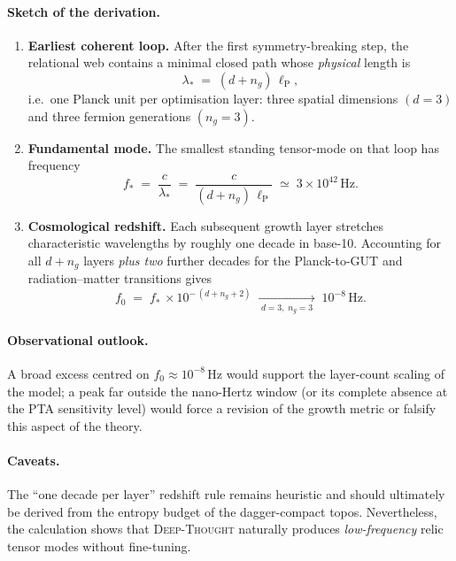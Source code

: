 \documentclass{article}
\begin{document}
\paragraph{Sketch of the derivation.}

\begin{enumerate}
\item\textbf{Earliest coherent loop.}  
  After the first symmetry-breaking step, the relational web contains a
  minimal closed path whose \emph{physical} length is
  \[
     \lambda_{*} \;=\; (d+n_{g})\,\ell_{\mathrm{P}},
  \]
  i.e.\ one Planck unit per optimisation layer:
  three spatial dimensions \((d=3)\) and three fermion generations
  \((n_{g}=3)\).

\item\textbf{Fundamental mode.}  
  The smallest standing tensor-mode on that loop has frequency
  \[
     f_{*}\;=\;\frac{c}{\lambda_{*}}
              \;=\;\frac{c}{(d+n_{g})\,\ell_{\mathrm{P}}}
              \;\simeq\;3\times10^{42}\,\text{Hz}.
  \]

\item\textbf{Cosmological redshift.}  
  Each subsequent growth layer stretches characteristic wavelengths by
  roughly one decade in base-10.  
  Accounting for all \(d+n_{g}\) layers \emph{plus two} further decades
  for the Planck-to-GUT and radiation–matter transitions gives
  \[
     f_{0}
       \;=\;
        f_{*}\,\times 10^{-\,(d+n_{g}+2)}
       \;\xrightarrow[\;d=3,\;n_{g}=3\;]{}\;
        10^{-8}\,\text{Hz}.
  \]
\end{enumerate}

\paragraph{Observational outlook.}
A broad excess centred on \(f_{0}\!\approx\!10^{-8}\,\mathrm{Hz}\)
would support the layer-count scaling of the model; a peak far outside
the nano-Hertz window (or its complete absence at the PTA sensitivity
level) would force a revision of the growth metric or falsify this
aspect of the theory.

\paragraph{Caveats.}
The “one decade per layer” redshift rule remains heuristic and should
ultimately be derived from the entropy budget of the dagger-compact
topos.  Nevertheless, the calculation shows that \textsc{Deep-Thought}
naturally produces \emph{low-frequency} relic tensor modes without
fine-tuning.
\end{document}
